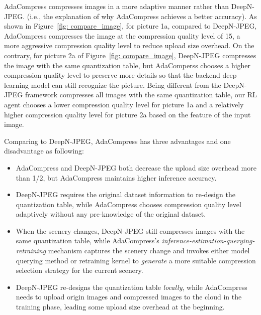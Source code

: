 AdaCompress compresses images in a more adaptive manner rather than DeepN-JPEG. (i.e., the explanation of why AdaCompress achieves a better accuracy). As shown in Figure~\ref{fig: compare_image}, for picture 1a, compared to DeepN-JPEG, AdaCompress compresses the image at the compression quality level of 15, a more aggressive compression quality level to reduce upload size overhead. On the contrary, for picture 2a of Figure~\ref{fig: compare_image}, DeepN-JPEG compresses the image with the same quantization table, but AdaComperss chooses a higher compression quality level to preserve more details so that the backend deep learning model can still recognize the picture. Being different from the DeepN-JPEG framework compresses all images with the same quantization table, our RL agent chooses a lower compression quality level for picture 1a and a relatively higher compression quality level for picture 2a based on the feature of the input image. 


Comparing to DeepN-JPEG, AdaCompress has three advantages and one disadvantage as following: %
    \begin{itemize}
        \item AdaCompress and DeepN-JPEG both decrease the upload size overhead more than 1/2, but AdaCompress maintains higher inference accuracy.
        \item DeepN-JPEG requires the original dataset information to re-design the quantization table, while AdaCompress chooses compression quality level adaptively without any pre-knowledge of the original dataset. 
        \item When the scenery changes, DeepN-JPEG still compresses images with the same quantization table, while AdaCompress's \emph{inference-estimation-querying-retraining} mechanism captures the scenery change and invokes either model querying method or retraining kernel to \emph{generate} a more suitable compression selection strategy for the current scenery.
        \item DeepN-JPEG re-designs the quantization table \emph{locally}, while AdaCompress needs to upload origin images and compressed images to the cloud in the training phase, leading some upload size overhead at the beginning. 
    \end{itemize}

